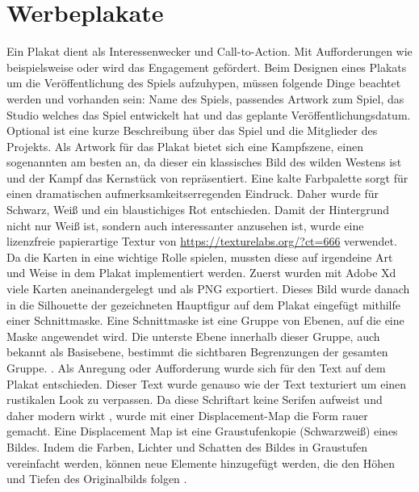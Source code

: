 \section{Werbeplakate}\label{sec:trailer}

\renewcommand{\kapitelautor}{Autor: Markus Böheim}

Ein Plakat dient als Interessenwecker und Call-to-Action. Mit Aufforderungen wie beispielsweise
 oder  wird das Engagement gefördert.
Beim Designen eines Plakats um die Veröffentlichung des Spiels aufzuhypen, müssen folgende Dinge beachtet werden und vorhanden sein: Name des Spiels, passendes Artwork zum Spiel, das Studio welches das Spiel entwickelt hat und das geplante Veröffentlichungsdatum. Optional ist eine kurze Beschreibung über das Spiel und die Mitglieder des Projekts.
Als Artwork für das Plakat bietet sich eine Kampfszene, einen sogenannten  am besten an, da dieser
ein klassisches Bild des wilden Westens ist und der Kampf das Kernstück von \FF repräsentiert. Eine kalte Farbpalette
sorgt für einen dramatischen aufmerksamkeitserregenden Eindruck. Daher wurde für Schwarz, Weiß und ein blaustichiges Rot
entschieden. Damit der Hintergrund nicht nur Weiß ist, sondern auch interessanter
anzusehen ist, wurde eine lizenzfreie papierartige Textur von \url{https://texturelabs.org/?ct=666} verwendet. Da die
Karten in \FF eine wichtige Rolle spielen, mussten diese auf irgendeine Art und Weise in dem Plakat implementiert
werden. Zuerst wurden mit Adobe Xd viele Karten aneinandergelegt und als PNG exportiert. Dieses Bild wurde danach in
die Silhouette der gezeichneten Hauptfigur auf dem Plakat eingefügt mithilfe einer Schnittmaske. Eine Schnittmaske ist eine Gruppe von Ebenen, auf die eine Maske angewendet wird.
Die unterste Ebene innerhalb dieser Gruppe, auch bekannt als Basisebene, bestimmt die sichtbaren Begrenzungen der gesamten Gruppe.
. Als Anregung oder Aufforderung wurde
sich für den Text
 auf dem Plakat entschieden. Dieser Text wurde genauso wie der Text
 texturiert um einen rustikalen Look zu verpassen. Da diese Schriftart keine Serifen aufweist und
daher modern wirkt  , wurde mit einer Displacement-Map die Form rauer gemacht. Eine Displacement Map ist eine
Graustufenkopie (Schwarzweiß) eines Bildes. Indem die Farben, Lichter und Schatten des Bildes in Graustufen
vereinfacht werden, können neue Elemente hinzugefügt werden, die den Höhen und Tiefen des Originalbilds folgen .
